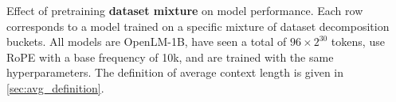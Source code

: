     \vspace{1mm}
    \caption{Effect of pretraining {\bf dataset mixture} on model performance. Each row corresponds to a model trained on a specific mixture of dataset decomposition buckets. All models are OpenLM-1B, have seen a total of $96 \times 2^{30}$ tokens, use RoPE with a base frequency of 10k, and are trained with the same hyperparameters. The definition of average context length is given in \cref{sec:avg_definition}.}
    \label{tab:mixture}